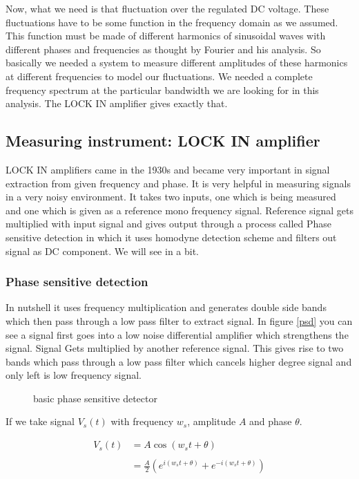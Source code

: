 \documentclass[draft,12pt]{article}
\begin{document}
Now, what we need is that fluctuation over the regulated DC voltage. These fluctuations have to be some function in the frequency domain as we assumed. This function must be made of different harmonics of sinusoidal waves with different phases and frequencies as thought by Fourier and his analysis. So basically we needed a system to measure different amplitudes of these harmonics at different frequencies to model our fluctuations. We needed a complete frequency spectrum at the particular bandwidth we are looking for in this analysis. The LOCK IN amplifier gives exactly that. 


\subsection{Measuring instrument: LOCK IN amplifier}

LOCK IN amplifiers came in the 1930s and became very important in signal extraction from given frequency and phase. It is very helpful in measuring signals in a very noisy environment. It takes two inputs, one which is being measured and one which is given as a reference mono frequency signal. Reference signal gets multiplied with input signal and gives output through a process called Phase sensitive detection in which it uses homodyne detection scheme and filters out signal as DC component. We will see in a bit.

\subsubsection{Phase sensitive detection}

In nutshell it uses frequency multiplication and generates double side bands which then pass through a low pass filter to extract signal. In figure \ref{psd} you can see a signal first goes into a low noise differential amplifier which strengthens the signal. Signal Gets multiplied by another reference signal. This gives rise to two bands which pass through a low pass filter which cancels higher degree signal and only left is low frequency signal.


\begin{figure}[hbt!]
\caption{basic phase sensitive detector}
\end{figure}

If we take signal $V_s(t)$ with frequency $w_s$, amplitude $A$ and phase $\theta$. 

\begin{align*}
V_{s}(t) & = A \cos(w_st+\theta)\\
\\
& = \frac{A}{2} (e^{i(w_st+\theta)}+e^{-i(w_st+\theta)})\\
\end{align*}
\end{document}

